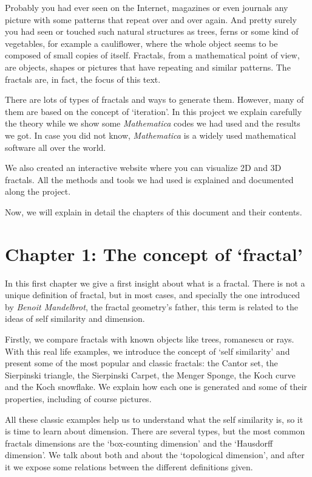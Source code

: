 
Probably you had ever seen on the Internet, magazines or even journals any picture with some patterns that repeat over and over again. And pretty surely you had seen or touched such natural structures as trees, ferns or some kind of vegetables, for example a cauliflower, where the whole object seems to be composed of small copies of itself. Fractals, from a mathematical point of view, are objects, shapes or pictures that have repeating and similar patterns. The fractals are, in fact, the focus of this text.

There are lots of types of fractals and ways to generate them. However, many of them are based on the concept of `iteration'. In this project we explain carefully the theory while we show some \textit{Mathematica} codes we had used and the results we got. In case you did not know, \textit{Mathematica} is a widely used mathematical software all over the world. 

We also created an interactive website where you can visualize 2D and 3D fractals. All the methods and tools we had used is explained and documented along the project.

Now, we will explain in detail the chapters of this document and their contents.

\section*{Chapter 1: The concept of `fractal'}

In this first chapter we give a first insight about what is a fractal. There is not a unique definition of fractal, but in most cases, and specially the one introduced by \textit{Benoit Mandelbrot}, the fractal geometry's father, this term is related to the ideas of self similarity and dimension. 

Firstly, we compare fractals with known objects like trees, romanescu or rays. With this real life examples, we introduce the concept of `self similarity' and present some of the most popular and classic fractals: the Cantor set, the Sierpinski triangle, the Sierpinski Carpet, the Menger Sponge, the Koch curve and the Koch snowflake. We explain how each one is generated and some of their properties, including of course pictures.

All these classic examples help us to understand what the self similarity is, so it is time to learn about dimension. There are several types, but the most common fractals dimensions are the `box-counting dimension' and the `Hausdorff dimension'. We talk about both and about the `topological dimension', and after it we expose some relations between the different definitions given.

